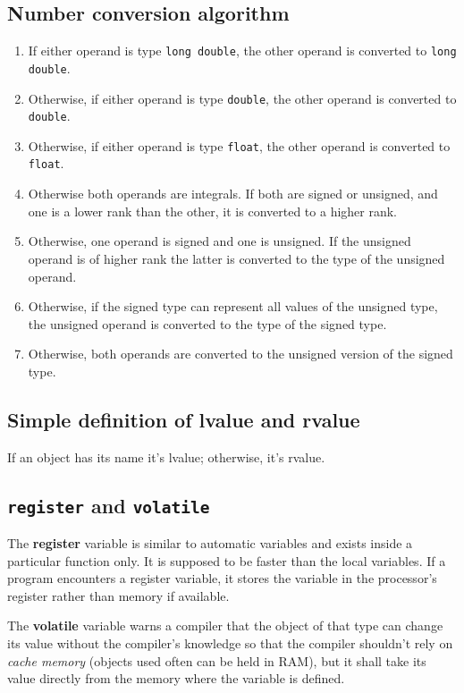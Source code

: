 \documentclass[../main]{subfiles}
\begin{document}
\subsection{Number conversion algorithm}
\begin{enumerate}
    \item If either operand is type \texttt{long double}, the other operand is converted to \texttt{long double}.
    \item Otherwise, if either operand is type \texttt{double}, the other operand is converted to \texttt{double}.
    \item Otherwise, if either operand is type \texttt{float}, the other operand is converted to \texttt{float}.
    \item Otherwise both operands are integrals. If both are signed or unsigned, and one is a lower rank than the other, it is converted to a higher rank.
    \item Otherwise, one operand is signed and one is unsigned. If the unsigned operand is of higher rank the latter is converted to the type of the unsigned operand.
    \item Otherwise, if the signed type can represent all values of the unsigned type, the unsigned operand is converted to the type of the signed type.
    \item Otherwise, both operands are converted to the unsigned version of the signed type.
\end{enumerate}

\subsection{Simple definition of lvalue and rvalue}
    If an object has its name it's lvalue; otherwise, it's rvalue.

\subsection{\texttt{register} and \texttt{volatile}}
    The \textbf{register} variable is similar to automatic variables and exists inside a particular function only. It is supposed to be faster than the local variables.
If a program encounters a register variable, it stores the variable in the processor's register rather than memory if available.\newline

    The \textbf{volatile} variable warns a compiler that the object of that type can change its value without the compiler's knowledge so that the compiler shouldn't rely on
\textit{cache memory} (objects used often can be held in RAM), but it shall take its value directly from the memory where the variable is defined.
\end{document}
